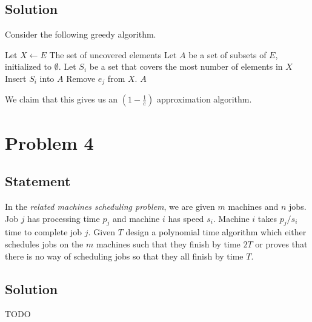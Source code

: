 \documentclass[a4paper]{article}
\begin{document}
\subsection{Solution}

Consider the following greedy algorithm.
\begin{algorithmic}[1]
        \State Let $X \gets E$ \Comment The set of uncovered elements
        \State Let $A$ be a set of subsets of $E$, initialized to $\emptyset$.
            \State Let $S_i$ be a set that covers the most number of elements in $X$
            \State Insert $S_i$ into $A$
                    \State Remove $e_j$ from $X$.
                \EndIf
            \EndFor
        \EndFor
        \State \Return $A$
    \EndFunction
\end{algorithmic}

We claim that this gives us an $\left(1 - \frac{1}{e}\right)$ approximation algorithm.

\newpage

\section{Problem 4}
\subsection{Statement}
In the \emph{related machines scheduling problem}, we are given $m$ machines and $n$ jobs. Job $j$ has processing time $p_j$ and machine $i$ has speed $s_i$.  Machine $i$ takes $p_j/s_i$ time to
complete job $j$. Given $T$ design a polynomial time algorithm which either schedules jobs on the $m$ machines such that they finish by time $2T$ or proves that there is no way of scheduling jobs so
that they all finish by time $T$.
\subsection{Solution}
TODO
\end{document}
